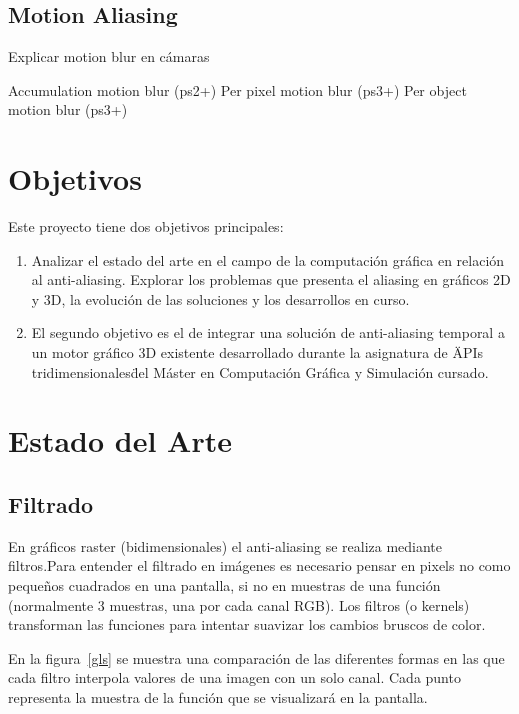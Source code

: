 \documentclass[withindex, glossary]{cam-thesis}
\begin{document}
\section{Motion Aliasing}
Explicar motion blur en cámaras

Accumulation motion blur (ps2+)
Per pixel motion blur (ps3+)
Per object motion blur (ps3+)

\chapter{Objetivos}

Este proyecto tiene dos objetivos principales:

\begin{enumerate}
    \item Analizar el estado del arte en el campo de la computación gráfica en relación al anti-aliasing. Explorar los problemas que presenta el aliasing en gráficos 2D y 3D, la evolución de las soluciones y los desarrollos en curso.
    \item El segundo objetivo es el de integrar una solución de anti-aliasing temporal a un motor gráfico 3D existente desarrollado durante la asignatura de \"APIs tridimensionales\" del Máster en Computación Gráfica y Simulación cursado.
\end{enumerate}

\chapter{Estado del Arte}

\section{Filtrado}

En gráficos raster (bidimensionales) el anti-aliasing se realiza mediante filtros.Para entender el filtrado en imágenes es necesario pensar en pixels no como pequeños cuadrados en una pantalla, si no en muestras de una función (normalmente 3 muestras, una por cada canal RGB)\cite{Smith95apixel}. Los filtros (o kernels) transforman las funciones para intentar suavizar los cambios bruscos de color.

En la figura~\ref{gls} se muestra una comparación de las diferentes formas en las que cada filtro interpola valores de una imagen con un solo canal. Cada punto representa la muestra de la función que se visualizará en la pantalla.

\end{document}
